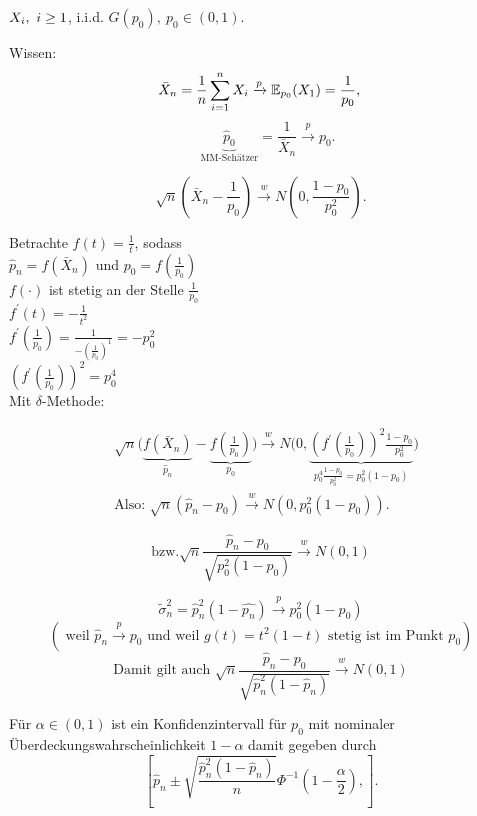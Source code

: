 \documentclass{tstextbook}
\begin{document}
\begin{example} 
	
	$ \\ X_i, \ i \ge 1 $, i.i.d. $ G(p_0), \ p_0 \in (0,1) $. 
	
	Wissen: 
	\[ 
	\bar{X}_n = \frac{1}{n} \sum_{i=1}^{n} X_i  \xrightarrow{p} \mathbb E_{p_0}(X_1) = \frac{1}{p_0}, \\
	\]
	\[ 
	 \quad \underbrace{\hat{p}_0}_{\text{MM-Schätzer}}  = \frac{1}{\bar{X}_n} \xrightarrow{p} p_0. 
	\]
	
	\[
	\sqrt{n}\left(\bar{X}_n-\frac{1}{p_0}\right) \xrightarrow{w} N\left(0, \frac{1-p_0}{p_0^2} \right) .
	\]
	
	Betrachte $ f(t) = \frac{1}{t} $, sodass \\
	$\hat{p}_n = f(\bar{X}_n)$ und $p_0=f(\frac{1}{p_0})$ \\
	$f(\cdot)$ ist stetig an der Stelle $\frac{1}{p_0}$ \\
	$ f^\prime(t) {=} - \frac{1}{t^2} $\\
	$ f^\prime(\frac{1}{p_0}) {=}  \frac{1}{-(\frac{1}{p_0})^1}   {=} - p_0^2 $\\
	$ (f^\prime(\frac{1}{p_0}))^2 {=}   p_0^4 $\\
	Mit $ \delta $-Methode: 
	
	\[
	\begin{aligned}
	& \sqrt{n} \Big( \underbrace{f\left(\bar{X}_n\right)}_{\hat{p}_n} 
	-\underbrace{f\left(\frac{1}{p_0}\right)}_{p_0} \Big) \xrightarrow{w} 
	N \Big(0, \underbrace{\left(f^\prime \left(\frac{1}{p_0}\right)\right)^2 \frac{1-p_0}{p_0^2} }
	_{p_0^4\frac{1-p_0}{p_0^2}= p_0^2(1-p_0)} \Big)\\
	& \text{Also: } \sqrt{n}\left(\hat{p}_n-p_0\right) \xrightarrow{w} N\left(0, p_0^2(1-p_0)\right).
	\end{aligned}
	\]
	
	\[
	\text{bzw.}  \sqrt{n}\frac{\hat{p}_n - p_0}{\sqrt{p_0^2(1-p_0)}} \xrightarrow{w} N(0,1)
	\]
	
	\[
	\tilde{\sigma}_n^2 = {\hat{p}_n^2(1-\hat{p_n})}  \xrightarrow{p} {p_0^2(1-p_0)}
	\]
	\[
	(\text{ weil } \hat{p}_n \xrightarrow{p} p_0 \text{ und weil } g(t)=t^2(1-t) \text{ stetig ist im Punkt } p_0  )
	\]
	\[
	\text{Damit gilt auch } \sqrt{n}\frac{\hat{p}_n - p_0}{\sqrt{\hat{p}_n^2(1-\hat{p}_n)}} \xrightarrow{w} N(0,1)
	\]

	
	Für $ \alpha \in (0,1) $ ist ein Konfidenzintervall für $ p_0 $ mit nominaler Überdeckungswahrscheinlichkeit $ 1-\alpha $ damit gegeben durch 
	\[
	\left[ 
	\hat{p}_n \pm \sqrt{\frac{\hat{p}_n^2(1-\hat{p}_n)}{n}} \Phi^{-1} \left(1-\frac{\alpha}{2}\right), \right] .
	\]
\end{example}
\end{document}
